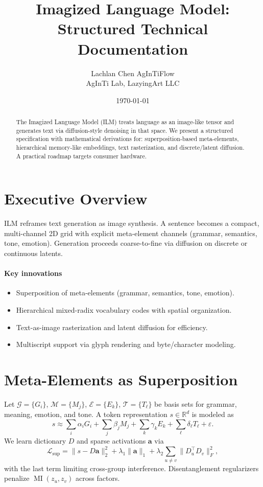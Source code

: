 \documentclass[11pt]{article}
\title{Imagized Language Model: Structured Technical Documentation}
\author{\begin{tabular}{c}Lachlan Chen \quad AgInTiFlow\\AgInTi Lab, LazyingArt LLC\end{tabular}}
\date{\today}
\begin{document}
\maketitle

\begin{abstract}
The Imagized Language Model (ILM) treats language as an image-like tensor and generates text via diffusion-style denoising in that space. We present a structured specification with mathematical derivations for: superposition-based meta-elements, hierarchical memory-like embeddings, text rasterization, and discrete/latent diffusion. A practical roadmap targets consumer hardware.
\end{abstract}

\tableofcontents

\section{Executive Overview}
ILM reframes text generation as image synthesis. A sentence becomes a compact, multi-channel 2D grid with explicit meta-element channels (grammar, semantics, tone, emotion). Generation proceeds coarse-to-fine via diffusion on discrete or continuous latents.

\paragraph{Key innovations}
\begin{itemize}[noitemsep,topsep=2pt]
  \item Superposition of meta-elements (grammar, semantics, tone, emotion).
  \item Hierarchical mixed-radix vocabulary codes with spatial organization.
  \item Text-as-image rasterization and latent diffusion for efficiency.
  \item Multiscript support via glyph rendering and byte/character modeling.
\end{itemize}

\section{Meta-Elements as Superposition}
Let $\mathcal{G}{=}\{G_i\}$, $\mathcal{M}{=}\{M_j\}$, $\mathcal{E}{=}\{E_k\}$, $\mathcal{T}{=}\{T_\ell\}$ be basis sets for grammar, meaning, emotion, and tone. A token representation $s\in\mathbb{R}^d$ is modeled as
\begin{equation}
  s \approx \sum_{i} \alpha_i G_i + \sum_{j} \beta_j M_j + \sum_{k} \gamma_k E_k + \sum_{\ell} \delta_\ell T_\ell + \varepsilon.
\end{equation}
We learn dictionary $D$ and sparse activations $\bm{a}$ via
\begin{equation}
\mathcal{L}_{\text{sup}}=\| s - D\bm{a} \|_2^2 + \lambda_1\|\bm{a}\|_1 + \lambda_2\sum_{u\ne v}\|D_u^\top D_v\|_F^2,
\end{equation}
with the last term limiting cross-group interference. Disentanglement regularizers penalize $\operatorname{MI}(z_u,z_v)$ across factors.
\end{document}
